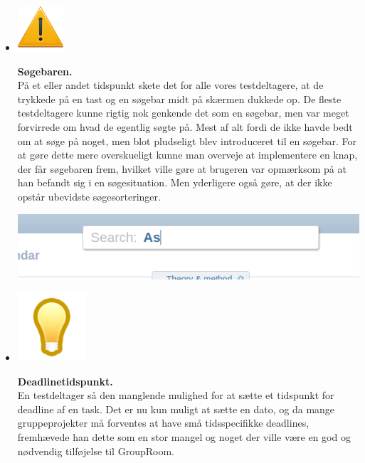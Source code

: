\documentclass[12pt]{article}
\begin{document}
\begin{itemize}
   \item[]       \begin{minipage}{0.07\linewidth}
  \includegraphics[scale=0.4]{Billeder/alvorligt}
          \end{minipage}\textbf{Søgebaren.}\\ På et eller andet tidspunkt skete det for alle vores testdeltagere, at de trykkede på en tast og en søgebar midt på skærmen dukkede op. De fleste testdeltagere kunne rigtig nok genkende det som en søgebar, men var meget forvirrede om hvad de egentlig søgte på. Mest af alt fordi de ikke havde bedt om at søge på noget, men blot pludseligt blev introduceret til en søgebar. For at gøre dette mere overskueligt kunne man overveje at implementere en knap, der får søgebaren frem, hvilket ville gøre at brugeren var opmærksom på at han befandt sig i en søgesituation. Men yderligere også gøre, at der ikke opstår ubevidste søgesorteringer.  
 
      \begin{center}\includegraphics[scale=0.4]{Billeder/search}\end{center}


   \item[]       \begin{minipage}{0.07\linewidth}
  \includegraphics[scale=0.4]{Billeder/ide}
          \end{minipage}\textbf{Deadlinetidspunkt.} \\En testdeltager så den manglende mulighed for at sætte et tidspunkt for deadline af en task. Det er nu kun muligt at sætte en dato, og da mange gruppeprojekter må forventes at have små tidsspecifikke deadlines, fremhævede han dette som en stor mangel og noget der ville være en god og nødvendig tilføjelse til GroupRoom.


\end{itemize}
\end{document}
